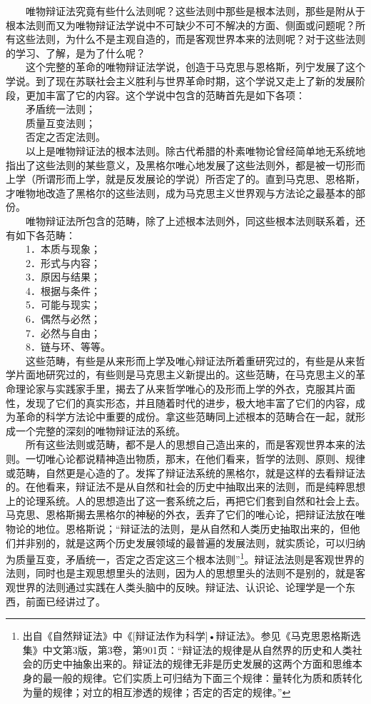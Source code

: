 \documentclass[cn,11pt,chinese]{elegantbook}
\begin{document}
　　唯物辩证法究竟有些什么法则呢？这些法则中那些是根本法则，那些是附从于根本法则而又为唯物辩证法学说中不可缺少不可不解决的方面、侧面或问题呢？所有这些法则，为什么不是主观自造的，而是客观世界本来的法则呢？对于这些法则的学习、了解，是为了什么呢？\\
　　这个完整的革命的唯物辩证法学说，创造于马克思与恩格斯，列宁发展了这个学说。到了现在苏联社会主义胜利与世界革命时期，这个学说又走上了新的发展阶段，更加丰富了它的内容。这个学说中包含的范畴首先是如下各项：\\
　　矛盾统一法则；\\
　　质量互变法则；\\
　　否定之否定法则。\\
　　以上是唯物辩证法的根本法则。除古代希腊的朴素唯物论曾经简单地无系统地指出了这些法则的某些意义，及黑格尔唯心地发展了这些法则外，都是被一切形而上学（所谓形而上学，就是反发展论的学说）所否定了的。直到马克思、恩格斯，才唯物地改造了黑格尔的这些法则，成为马克思主义世界观与方法论之最基本的部份。\\
　　唯物辩证法所包含的范畴，除了上述根本法则外，同这些根本法则联系着，还有如下各范畴：\\
　　1．本质与现象；\\
　　2．形式与内容；\\
　　3．原因与结果；\\
　　4．根据与条件；  \\
　　5．可能与现实；\\
　　6．偶然与必然；\\
　　7．必然与自由；\\
　　8．链与环、等等。\\
　　这些范畴，有些是从来形而上学及唯心辩证法所着重研究过的，有些是从来哲学片面地研究过的，有些则是马克思主义新提出的。这些范畴，在马克思主义的革命理论家与实践家手里，揭去了从来哲学唯心的及形而上学的外衣，克服其片面性，发现了它们的真实形态，并且随着时代的进步，极大地丰富了它们的内容，成为革命的科学方法论中重要的成份。拿这些范畴同上述根本的范畴合在一起，就形成一个完整的深刻的唯物辩证法的系统。\\
　　所有这些法则或范畴，都不是人的思想自己造出来的，而是客观世界本来的法则。一切唯心论都说精神造出物质，那末，在他们看来，哲学的法则、原则、规律或范畴，自然更是心造的了。发挥了辩证法系统的黑格尔，就是这样的去看辩证法的。在他看来，辩证法不是从自然和社会的历史中抽取出来的法则，而是纯粹思想上的论理系统。人的思想造出了这一套系统之后，再把它们套到自然和社会上去。马克思、恩格斯揭去黑格尔的神秘的外衣，丢弃了它们的唯心论，把辩证法放在唯物论的地位。恩格斯说；“辩证法的法则，是从自然和人类历史抽取出来的，但他们并非别的，就是这两个历史发展领域的最普遍的发展法则，就实质论，可以归纳为质量互变，矛盾统一，否定之否定这三个根本法则”\footnote[2]{ 出自《自然辩证法》中《[辩证法作为科学]•辩证法》。参见《马克思恩格斯选集》中文第3版，第3卷，第901页：“辩证法的规律是从自然界的历史和人类社会的历史中抽象出来的。辩证法的规律无非是历史发展的这两个方面和思维本身的最一般的规律。它们实质上可归结为下面三个规律：量转化为质和质转化为量的规律；对立的相互渗透的规律；否定的否定的规律。”}。辩证法法则是客观世界的法则，同时也是主观思想里头的法则，因为人的思想里头的法则不是别的，就是客观世界的法则通过实践在人类头脑中的反映。辩证法、认识论、论理学是一个东西，前面已经讲过了。\\
\end{document}
